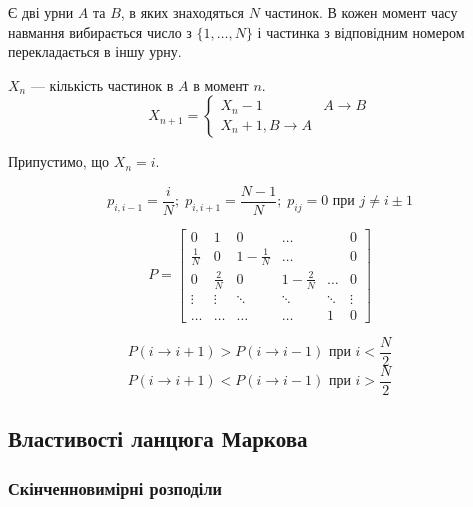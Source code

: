 \begin{example}
  Є дві урни $A$ та $B$, в яких знаходяться  $N$ частинок. В кожен момент часу
  навмання вибирається число з $\{1, \ldots, N\}$ і частинка з відповідним номером
  перекладається в іншу урну.

  $X_n$ --- кількість частинок в $A$ в момент $n$.
  \[ X_{n+1} = \begin{cases}
    X_{n} - 1 & A \to  B \\
    X_n + 1, B \to  A
  \end{cases} \] 

  Припустимо, що $X_n = i$.

  \[ p_{i,i-1} = \frac{i}{N}; \; p_{i,i+1} = \frac{N-1}{N}; \; p_{ij} = 0 \text{ при } j \neq i \pm 1 \] 

  \[ P = \begin{bmatrix} 
    0 & 1 & 0 & \ldots && 0 \\
    \frac{1}{N} & 0 & 1 - \frac{1}{N} & \ldots && 0 \\
    0 & \frac{2}{N} & 0 & 1 - \frac{2}{N} & \ldots & 0 \\
    \vdots & \vdots & \ddots & \ddots & \ddots & \vdots \\
    \ldots & \ldots & \ldots & \ldots & 1 & 0
  \end{bmatrix}  \] 

  \[ P(i \to i+1) > P(i\to i-1) \text{ при } i < \frac{N}{2} \] 
  \[ P(i\to i+1) < P(i\to i-1) \text{ при } i > \frac{N}{2} \] 
\end{example}


\subsection{Властивості ланцюга Маркова}
\subsubsection{Скінченновимірні розподіли}

